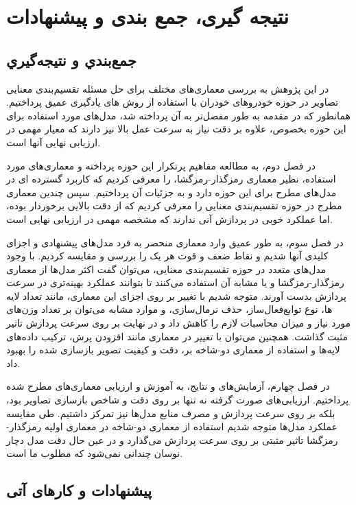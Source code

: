 \chapter{نتیجه گیری، جمع ‌بندی و پیشنهادات}

\section{جمع‌بندي و نتيجه‌گيري}

در این پژوهش به بررسی معماری‌های مختلف برای حل مسئله تقسیم‌بندی معنایی تصاویر در حوزه خودرو‌های خودران با استفاده از روش های یادگیری عمیق پرداختیم. همانطور که در مقدمه به طور مفصل‌تر به آن پرداخته شد، مدل‌های مورد استفاده برای این حوزه بخصوص، علاوه بر دقت نیاز به سرعت عمل بالا نیز دارند که معیار مهمی در ارزیابی نهایی آنها است.

در فصل دوم، به مطالعه مفاهیم پرتکرار این حوزه پرداخته و معماری‌های مورد استفاده، نظیر معماری رمزگذار-رمزگشا، را معرفی کردیم که کاربرد گسترده ای در مدل‌های مطرح برای این حوزه دارد و به جزئیات آن پرداختیم. سپس چندین معماری مطرح در حوزه تقسیم‌بندی معنایی را معرفی کردیم که از دقت بالایی برخوردار بوده، اما عملکرد خوبی در پردازش آنی ندارند که مشخصه مهمی در ارزیابی نهایی است.

در فصل سوم، به طور عمیق وارد معماری منحصر به فرد مدل‌های پیشنهادی و اجزای کلیدی آنها شدیم و نقاط ضعف و قوت هر یک را بررسی و مقایسه کردیم. با وجود مدل‌های متعدد در حوزه تقسیم‌بندی معنایی، می‌توان گفت اکثر مدل‌ها از معماری رمزگذار-رمزگشا و یا مشابه آن استفاده می‌کنند تا بتوانند عملکرد بهینه‌تری در سرعت پردازش بدست آورند. متوجه شدیم با تغییر بر روی اجزای این معماری، مانند تعداد لایه ها، نوع توابع‌فعال‌ساز، حذف نرمال‌سازی، و موارد مشابه می‌توان بر تعداد وزن‌های مورد نیاز و میزان محاسبات لازم را کاهش داد و در نهایت بر روی سرعت پردازش تاثیر مثبت گذاشت. همچنین می‌توان با تغییر در معماری مانند افزودن پرش، ترکیب داده‌های لایه‌ها و استفاده از معماری دو-شاخه بر، دقت و کیفیت تصویر بازسازی شده را بهبود داد.

در فصل چهارم، آزمایش‌های و نتایج، به آموزش و ارزیابی معماری‌های مطرح شده پرداختیم. ارزیابی‌های صورت گرفته نه تنها بر روی دقت و شاخص بازسازی تصاویر بود، بلکه بر روی سرعت پردازش و مصرف منابع مدل‌ها نیز تمرکز داشتیم. طی مقایسه عملکرد مدل‌ها متوجه شدیم استفاده از معماری دو-شاخه در معماری اولیه رمزگذار-رمزگشا تاثیر مثبتی بر روی سرعت پردازش می‌گذارد و در عین حال دقت مدل دچار نوسان چندانی نمی‌شود که مطلوب ما است.

\section{پیشنهادات و کار‌های آتی}

